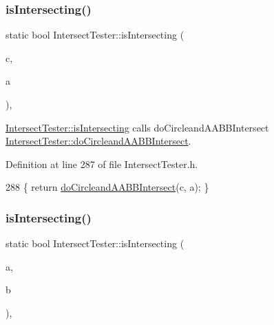 \subsubsection{\texorpdfstring{is\+Intersecting()}{isIntersecting()}\hspace{0.1cm}{\footnotesize\ttfamily [12/15]}}
{\footnotesize\ttfamily static bool Intersect\+Tester\+::is\+Intersecting (\begin{DoxyParamCaption}\item[{\hyperlink{class_circle}{Circle}}]{c,  }\item[{\hyperlink{class_a_a_b_b}{A\+A\+BB}}]{a }\end{DoxyParamCaption})\hspace{0.3cm}{\ttfamily [inline]}, {\ttfamily [static]}}



\hyperlink{class_intersect_tester_a7710e17ff7d2e229059f23b9429213f5}{Intersect\+Tester\+::is\+Intersecting} calls do\+Circleand\+A\+A\+B\+B\+Intersect  \hyperlink{class_intersect_tester_af76b72861b57c630e7c54ad9449a2d27}{Intersect\+Tester\+::do\+Circleand\+A\+A\+B\+B\+Intersect}. 



Definition at line 287 of file Intersect\+Tester.\+h.


\begin{DoxyCode}
288     \{ \textcolor{keywordflow}{return} \hyperlink{class_intersect_tester_af76b72861b57c630e7c54ad9449a2d27}{doCircleandAABBIntersect}(c, a); \}
\end{DoxyCode}
\mbox{\label{class_intersect_tester_a7195f2152c0c36590c2cdbd0e7365a3b}} 
\subsubsection{\texorpdfstring{is\+Intersecting()}{isIntersecting()}\hspace{0.1cm}{\footnotesize\ttfamily [13/15]}}
{\footnotesize\ttfamily static bool Intersect\+Tester\+::is\+Intersecting (\begin{DoxyParamCaption}\item[{\hyperlink{class_triangle}{Triangle}}]{a,  }\item[{\hyperlink{class_triangle}{Triangle}}]{b }\end{DoxyParamCaption})\hspace{0.3cm}{\ttfamily [inline]}, {\ttfamily [static]}}



